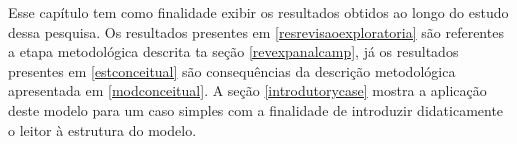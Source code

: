 Esse capítulo tem como finalidade exibir os resultados obtidos ao longo do estudo dessa pesquisa. Os resultados presentes em \ref{resrevisaoexploratoria} são referentes a etapa metodológica descrita ta seção \ref{revexpanalcamp}, já os resultados presentes em \ref{estconceitual} são consequências da descrição metodológica apresentada em \ref{modconceitual}. A seção \ref{introdutorycase} mostra a aplicação deste modelo para um caso simples com a finalidade de introduzir didaticamente o leitor à estrutura do modelo. 